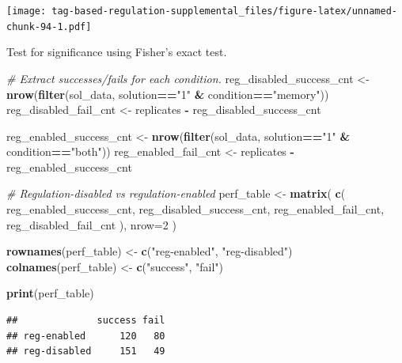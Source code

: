\documentclass[
]{book}
\newenvironment{Shaded}{\begin{snugshade}}{\end{snugshade}}
\newcommand{\CommentTok}[1]{\textcolor[rgb]{0.56,0.35,0.01}{\textit{#1}}}
\newcommand{\DataTypeTok}[1]{\textcolor[rgb]{0.13,0.29,0.53}{#1}}
\newcommand{\DecValTok}[1]{\textcolor[rgb]{0.00,0.00,0.81}{#1}}
\newcommand{\KeywordTok}[1]{\textcolor[rgb]{0.13,0.29,0.53}{\textbf{#1}}}
\newcommand{\NormalTok}[1]{#1}
\newcommand{\OperatorTok}[1]{\textcolor[rgb]{0.81,0.36,0.00}{\textbf{#1}}}
\newcommand{\StringTok}[1]{\textcolor[rgb]{0.31,0.60,0.02}{#1}}
\begin{document}
\texttt{[image: tag-based-regulation-supplemental\_files/figure-latex/unnamed-chunk-94-1.pdf]}

Test for significance using Fisher's exact test.

\begin{Shaded}
\begin{Highlighting}[]
\CommentTok{\# Extract successes/fails for each condition.}
\NormalTok{reg\_disabled\_success\_cnt \textless{}{-}}\StringTok{ }\KeywordTok{nrow}\NormalTok{(}\KeywordTok{filter}\NormalTok{(sol\_data, solution}\OperatorTok{==}\StringTok{"1"} \OperatorTok{\&}\StringTok{ }\NormalTok{condition}\OperatorTok{==}\StringTok{"memory"}\NormalTok{))}
\NormalTok{reg\_disabled\_fail\_cnt \textless{}{-}}\StringTok{ }\NormalTok{replicates }\OperatorTok{{-}}\StringTok{ }\NormalTok{reg\_disabled\_success\_cnt}

\NormalTok{reg\_enabled\_success\_cnt \textless{}{-}}\StringTok{ }\KeywordTok{nrow}\NormalTok{(}\KeywordTok{filter}\NormalTok{(sol\_data, solution}\OperatorTok{==}\StringTok{"1"} \OperatorTok{\&}\StringTok{ }\NormalTok{condition}\OperatorTok{==}\StringTok{"both"}\NormalTok{))}
\NormalTok{reg\_enabled\_fail\_cnt \textless{}{-}}\StringTok{ }\NormalTok{replicates }\OperatorTok{{-}}\StringTok{ }\NormalTok{reg\_enabled\_success\_cnt}

\CommentTok{\# Regulation{-}disabled vs regulation{-}enabled}
\NormalTok{perf\_table \textless{}{-}}\StringTok{ }\KeywordTok{matrix}\NormalTok{(}
  \KeywordTok{c}\NormalTok{(}
\NormalTok{    reg\_enabled\_success\_cnt,}
\NormalTok{    reg\_disabled\_success\_cnt,}
\NormalTok{    reg\_enabled\_fail\_cnt,}
\NormalTok{    reg\_disabled\_fail\_cnt}
\NormalTok{    ),}
    \DataTypeTok{nrow=}\DecValTok{2}
\NormalTok{)}

\KeywordTok{rownames}\NormalTok{(perf\_table) \textless{}{-}}\StringTok{ }\KeywordTok{c}\NormalTok{(}\StringTok{"reg{-}enabled"}\NormalTok{, }\StringTok{"reg{-}disabled"}\NormalTok{)}
\KeywordTok{colnames}\NormalTok{(perf\_table) \textless{}{-}}\StringTok{ }\KeywordTok{c}\NormalTok{(}\StringTok{"success"}\NormalTok{, }\StringTok{"fail"}\NormalTok{)}

\KeywordTok{print}\NormalTok{(perf\_table)}
\end{Highlighting}
\end{Shaded}

\begin{verbatim}
##              success fail
## reg-enabled      120   80
## reg-disabled     151   49
\end{verbatim}
\end{document}
